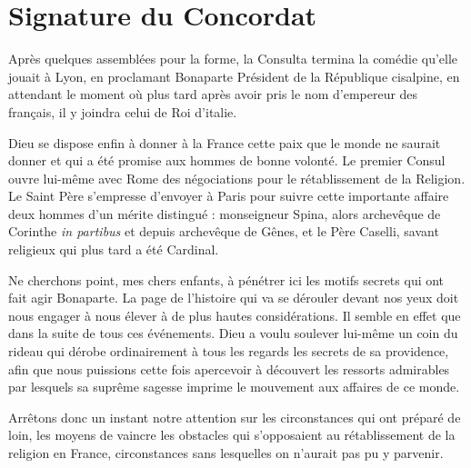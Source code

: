 \documentclass[11pt,a4paper]{report}
\begin{document}
\section*{Signature du Concordat}

Après quelques assemblées pour la forme, la Consulta termina la comédie qu'elle jouait à Lyon, en proclamant Bonaparte Président de la République cisalpine, en attendant le moment où plus tard après avoir pris le nom d'empereur des français, il y joindra celui de Roi d'italie.

Dieu se dispose enfin à donner à la France cette paix que le monde ne saurait donner et qui a été promise aux hommes de bonne volonté. Le premier Consul ouvre lui-même avec Rome des négociations pour le rétablissement de la Religion. Le Saint Père s'empresse d'envoyer à Paris pour suivre cette importante affaire deux hommes d'un mérite distingué : monseigneur Spina, alors archevêque de Corinthe \textit{in partibus} et depuis archevêque de Gênes, et le Père Caselli, savant religieux qui plus tard a été Cardinal.

Ne cherchons point, mes chers enfants, à pénétrer ici les motifs secrets qui ont fait agir Bonaparte. La page de l'histoire qui va se dérouler devant nos yeux doit nous engager à nous élever à de plus hautes considérations. Il semble en effet que dans la suite de tous ces événements. Dieu a voulu soulever lui-même un coin du rideau qui dérobe ordinairement à tous les regards les secrets de sa providence, afin que nous puissions cette fois apercevoir à découvert les ressorts admirables par lesquels sa suprême sagesse imprime le mouvement aux affaires de ce monde.

Arrêtons donc un instant notre attention sur les circonstances qui ont préparé de loin, les moyens de vaincre les obstacles qui s'opposaient au rétablissement de la religion en France, circonstances sans lesquelles on n'aurait pas pu y parvenir.
\end{document}
